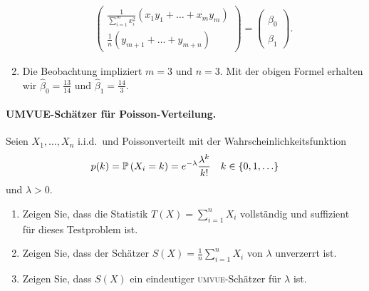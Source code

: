 \begin{enumerate}
\begin{eqnarray}
                \left(
                \begin{array}{c}
                    \frac{1}{\sum_{i=1}^{m} x_i^2} \left( x_1 y_1 + \ldots + x_m y_m \right)  \\
                    \frac{1}{n} \left( y_{m+1}+ \ldots + y_{m+n} \right)
                \end{array}
                \right) = \left(
                \begin{array}{c}
                    \hat\beta_0 \\ \hat\beta_1
                \end{array}
                \right).
            \end{eqnarray}
        \item Die Beobachtung impliziert $m=3$ und $n=3$. Mit der obigen Formel erhalten wir
            $\hat \beta_0 = \frac{13}{14}$ und $\hat \beta_1 = \frac{14}{3}$.
\end{enumerate}








\paragraph{UMVUE-Schätzer für Poisson-Verteilung. } Seien $X_1, \ldots, X_n$ i.i.d.\ 
und Poissonverteilt mit der Wahrscheinlichkeitsfunktion
\begin{equation*}
    p(k) = \mathbb P \left( X_i = k \right) = e^{-\lambda} \frac{\lambda^k}{ k!} \quad k \in \left\{ 0,1, \ldots \right\}
\end{equation*}
und $\lambda>0$.
\begin{enumerate}
    \item Zeigen Sie, dass die Statistik $T\left( X \right) = \sum_{i=1}^{n}
        X_i$ vollständig und suffizient für dieses Testproblem ist.
    \item Zeigen Sie, dass der Schätzer $S\left( X \right) = \frac{1}{n}
        \sum_{i=1}^{n} X_i$ von $\lambda$ unverzerrt ist.
    \item Zeigen Sie, dass $S(X)$ ein eindeutiger \textsc{umvue}-Schätzer für
        $\lambda$ ist.
\end{enumerate} 


